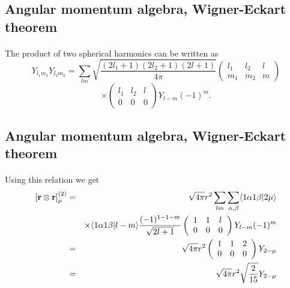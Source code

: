 \documentclass[%
twoside,                 %
final,                   %
10pt]{article}
\begin{document}
\subsection{Angular momentum algebra, Wigner-Eckart theorem}

\paragraph{}
The product of two spherical harmonics can be written
as
\[
Y_{l_1m_1} Y_{l_2m_2}=\sum_{lm}\sqrt{\frac{(2l_1+1)(2l_2+1)(2l+1)}{4\pi}}
\left(\begin{array}{ccc} l_1&l_2&l \\ m_1&m_2&m\end{array}\right)
\]
\[
\times \left(\begin{array}{ccc} l_1&l_2&l \\ 0  &0  &0\end{array}\right)
Y_{l-m}(-1)^m.
\]


\subsection{Angular momentum algebra, Wigner-Eckart theorem}

\paragraph{}
Using this relation we get  
\begin{eqnarray*}
\left[{\bf r} \otimes {\bf r} \right]^{(2)}_\mu &=& 
\sqrt{4\pi}r^2
\sum_{lm}
\sum_{\alpha ,\beta}   \langle 1\alpha 1\beta\vert 2\mu \rangle \\
&&\times \langle 1\alpha 1\beta\vert l-m \rangle
\frac{(-1)^{1-1-m}}{\sqrt{2l+1}} 
\left(\begin{array}{ccc} 1&1&l \\ 0  &0  &0\end{array}\right)Y_{l-m}(-1)^m\\
&=& \sqrt{4\pi}r^2
\left(\begin{array}{ccc} 1&1&2 \\ 0  &0  &0\end{array}\right)
Y_{2-\mu}\\
&=& \sqrt{4\pi}r^2 \sqrt{\frac{2}{15}}Y_{2-\mu}
\end{eqnarray*}
\end{document}
